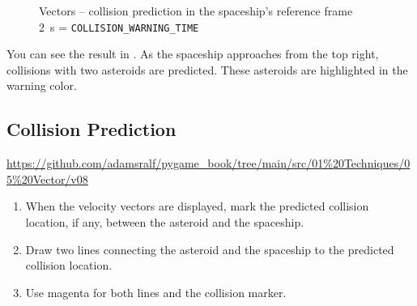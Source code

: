 \begin{figure}[htbp]
	\caption[Vectors -- collision prediction in the spaceship's reference frame]{Vectors -- collision prediction in the spaceship's reference frame\\ \SI{2}{\second} = \texttt{COLLISION\_WARNING\_TIME}}
	\label{picCollisionExpectedSimple}
\end{figure}

You can see the result in . As the spaceship approaches from the top right, collisions with two asteroids are predicted. These asteroids are highlighted in the warning color.


\newpage
\subsection{Collision Prediction}\label{secVectorCollisionPrediction}

\begin{diskbox}
	\url{https://github.com/adamsralf/pygame_book/tree/main/src/01%20Techniques/05%20Vector/v08}
\end{diskbox}


\begin{enumerate}
	\item When the velocity vectors are displayed, mark the predicted collision location, if any, between the asteroid and the spaceship.
	\item Draw two lines connecting the asteroid and the spaceship to the predicted collision location.
	\item Use magenta for both lines and the collision marker.
\end{enumerate}
\er

